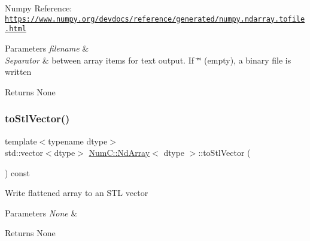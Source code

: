 Numpy Reference\+: \href{https://www.numpy.org/devdocs/reference/generated/numpy.ndarray.tofile.html}{\tt https\+://www.\+numpy.\+org/devdocs/reference/generated/numpy.\+ndarray.\+tofile.\+html}


\begin{DoxyParams}{Parameters}
{\em filename} & \\
\hline
{\em Separator} & between array items for text output. If \char`\"{}\char`\"{} (empty), a binary file is written \\
\hline
\end{DoxyParams}
\begin{DoxyReturn}{Returns}
None 
\end{DoxyReturn}
\mbox{\label{class_num_c_1_1_nd_array_a6c0fc5c26b9d536c8cbb2c344fb32125}} 
\subsubsection{\texorpdfstring{to\+Stl\+Vector()}{toStlVector()}}
{\footnotesize\ttfamily template$<$typename dtype$>$ \\
std\+::vector$<$dtype$>$ \mbox{\hyperlink{class_num_c_1_1_nd_array}{Num\+C\+::\+Nd\+Array}}$<$ dtype $>$\+::to\+Stl\+Vector (\begin{DoxyParamCaption}{ }\end{DoxyParamCaption}) const\hspace{0.3cm}{\ttfamily [inline]}}

Write flattened array to an S\+TL vector


\begin{DoxyParams}{Parameters}
{\em None} & \\
\hline
\end{DoxyParams}
\begin{DoxyReturn}{Returns}
None 
\end{DoxyReturn}
\mbox{\label{class_num_c_1_1_nd_array_a23fa05a861a45be62bb4c7650ecebcb3}} 
